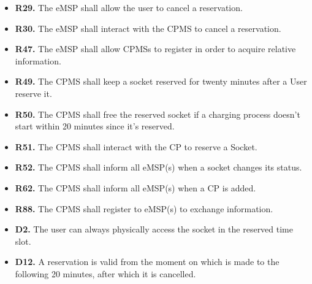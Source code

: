 \documentclass{Configuration_Files/PoliMi3i_thesis}
\begin{document}
\begin{enumerate}[label=\textbf{G\arabic*}]
\begin{itemize}
            \item \textbf{R29.} The eMSP shall allow the user to cancel a reservation.
            \item \textbf{R30.} The eMSP shall interact with the CPMS to cancel a reservation.
            \item \textbf{R47.} The eMSP shall allow CPMSs to register in order to acquire relative information.
            \item \textbf{R49.} The CPMS shall keep a socket reserved for twenty minutes after a User reserve it.
            \item \textbf{R50.} The CPMS shall free the reserved socket if a charging process doesn’t start within 20 minutes since it's reserved.
            \item \textbf{R51.} The CPMS shall interact with the CP to reserve a Socket.
            \item \textbf{R52.} The CPMS shall inform all eMSP(s) when a socket changes its status.
            \item \textbf{R62.} The CPMS shall inform all eMSP(s) when a CP is added.
            \item \textbf{R88.} The CPMS shall register to eMSP(s) to exchange information.
            \item \textbf{D2.} The user can always physically access the socket in the reserved time slot.
            \item \textbf{D12.} A reservation is valid from the moment on which is made to the following 20 minutes, after which it is cancelled.
        \end{itemize}
    

\end{enumerate}
\end{document}

